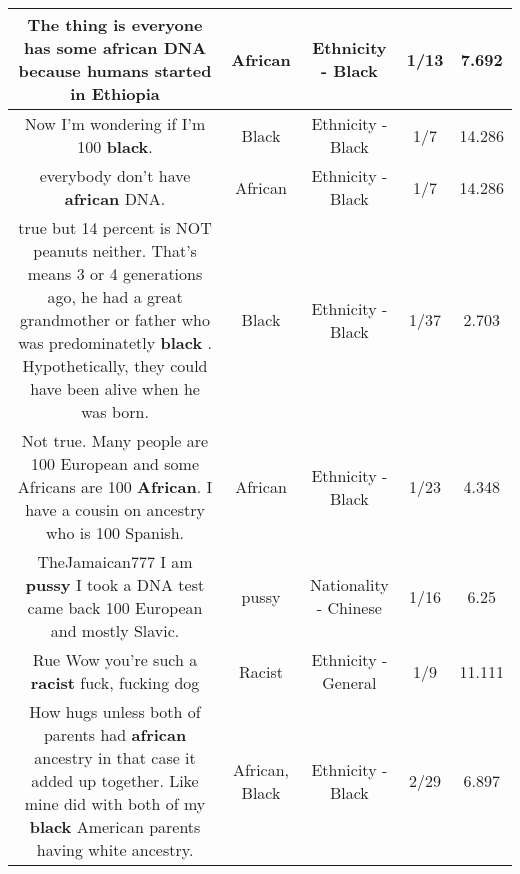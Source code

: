 \documentclass[11pt]{article}
\newlength\mylength
\begin{document}
\begin{center}
\begin{longtable}{|C{.65\mylength}|C{.30\mylength}|C{.12\mylength}|C{.12\mylength}|C{.12\mylength}|}
  \small The thing is everyone has some \textbf{african} DNA because humans started in Ethiopia\normalsize   & African & Ethnicity - Black & 1/13 & 7.692 \\  \hline
  \small Now I'm wondering if I'm 100 \textbf{black}.\normalsize   & Black & Ethnicity - Black & 1/7 & 14.286 \\  \hline
  \small {} everybody don't have \textbf{african} DNA.\normalsize   & African & Ethnicity - Black & 1/7 & 14.286 \\  \hline
  \small true but 14 percent is NOT peanuts neither.  That's means 3 or 4 generations ago, he had a great grandmother or father who was predominatetly \textbf{black} .   Hypothetically, they could have been alive when he was born.\normalsize   & Black & Ethnicity - Black & 1/37 & 2.703 \\  \hline
  \small Not true. Many people are 100 European and some Africans are 100 \textbf{African}. I have a cousin on ancestry who is 100 Spanish.\normalsize   & African & Ethnicity - Black & 1/23 & 4.348 \\  \hline
  \small TheJamaican777 I am \textbf{pussy} I took a DNA test came back 100 European and mostly Slavic.\normalsize   & pussy & Nationality - Chinese & 1/16 & 6.25 \\  \hline
  \small Rue Wow you're such a \textbf{racist} fuck, fucking dog\normalsize   & Racist & Ethnicity - General & 1/9 & 11.111 \\  \hline
  \small How hugs unless both of parents had \textbf{african} ancestry in that case it added up together. Like mine did with both of my \textbf{black} American parents having white ancestry.\normalsize   & African, Black & Ethnicity - Black & 2/29 & 6.897 \\  \hline

\end{longtable}
\end{center}
\end{document}
